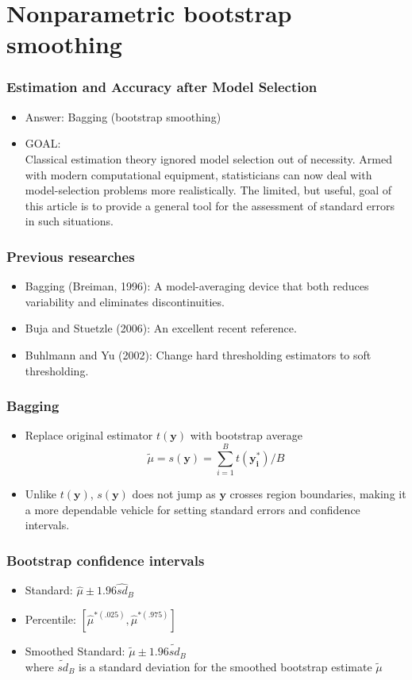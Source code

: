 \documentclass{beamer}
\begin{document}
\section{Nonparametric bootstrap smoothing}
\begin{frame}
\frametitle{Estimation and Accuracy after Model Selection}
\begin{itemize}
\item Answer: Bagging (bootstrap smoothing)
\item GOAL: \\
Classical estimation theory ignored model selection out of necessity. Armed with modern computational equipment, statisticians can now deal with model-selection problems more realistically. The limited, but useful, goal of this article is to provide a general tool for the assessment of standard errors in such situations.
\end{itemize}
\end{frame}
\begin{frame}
\frametitle{Previous researches}
\begin{itemize}
\item Bagging (Breiman, 1996): A model-averaging device that both reduces variability and eliminates discontinuities.
\item Buja and Stuetzle (2006): An excellent recent reference.
\item Buhlmann and Yu (2002): Change hard thresholding estimators to soft thresholding.
\end{itemize}
\end{frame}
\begin{frame}
\frametitle{Bagging}
\begin{itemize}
\item Replace original estimator $t(\mathbf{y})$ with bootstrap average
$$\tilde{\mu} =  s(\mathbf{y}) = \sum_{i=1} ^B t(\mathbf{y_i ^*})/B$$
\item Unlike $t(\mathbf{y})$, $s(\mathbf{y})$ does not jump as $\mathbf{y}$ crosses region boundaries, making it a more dependable vehicle for setting standard errors and confidence intervals.
\end{itemize}
\end{frame}
\begin{frame}
\frametitle{Bootstrap confidence intervals}
\begin{itemize}
\item Standard: $\hat{\mu} \pm 1.96 \hat{sd}_B$
\item Percentile: $[\hat{\mu}^{*(.025)},\hat{\mu}^{*(.975)}]$
\item Smoothed Standard: $\tilde{\mu} \pm 1.96 \tilde{sd}_B$ \\
where $\tilde{sd}_B$ is a standard deviation for the smoothed bootstrap estimate $\tilde{\mu}$
\end{itemize}
\end{frame}
\end{document}
